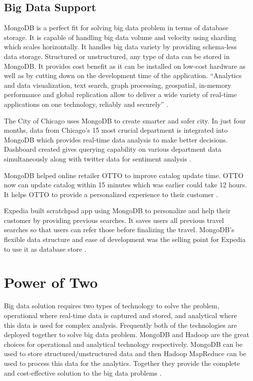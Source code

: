 \documentclass[sigconf]{acmart}
\begin{document}
\subsection{Big Data Support}
MongoDB is a perfect fit for solving big data problem in terms of database storage. It is capable of handling big data volume and velocity using sharding which scales horizontally. It handles big data variety by providing schema-less data storage. Structured or unstructured, any type of data can be stored in MongoDB. It provides cost benefit as it can be installed on low-cost hardware as well as by cutting down on the development time of the application. ``Analytics and data visualization, text search, graph processing, geospatial, in-memory performance and global replication allow to deliver a wide variety of real-time applications on one technology, reliably and securely'' \cite{www-mongo-arch}.

The City of Chicago uses MongoDB to create smarter and safer city. In just four months, data from Chicago's 15 most crucial department is integrated into MongoDB which provides real-time data analysis to make better decisions. Dashboard created gives querying capability on various department data simultaneously along with twitter data for sentiment analysis \cite{www-mongo-chicago}. 

MongoDB helped online retailer OTTO to improve catalog update time. OTTO now can update catalog within 15 minutes which was earlier could take 12 hours. It helps OTTO to provide a personalized experience to their customer \cite{www-mongo-otto}.

Expedia built scratchpad app using MongoDB to personalize and help their customer by providing previous searches. It saves users all previous travel searches so that users can refer those before finalizing the travel. MongoDB's flexible data structure and ease of development was the selling point for Expedia to use it as database store \cite{www-mongo-expedia}.

\section{Power of Two}
Big data solution requires two types of technology to solve the problem, operational where real-time data is captured and stored, and analytical where this data is used for complex analysis. Frequently both of the technologies are deployed together to solve big data problem. MongoDB and Hadoop are the great choices for operational and analytical technology respectively. MongoDB can be used to store structured/unstructured data and then Hadoop MapReduce can be used to process this data for the analytics. Together they provide the complete and cost-effective solution to the big data problems \cite{www-mongo-bigdata}.
\end{document}
